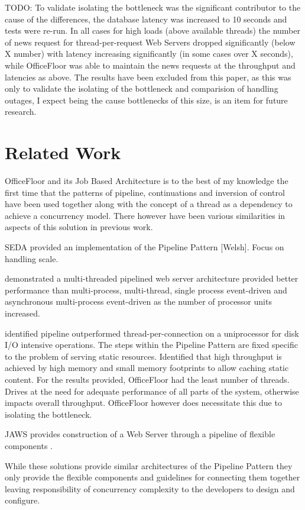 \documentclass[conference]{ieee/IEEEtran}
\begin{document}
TODO: To validate isolating the bottleneck was the significant contributor to
the cause of the differences, the database latency was increased to 10 seconds
and tests were re-run.  In all cases for high loads (above available threads)
the number of news request for thread-per-request Web Servers dropped
significantly (below X number) with latency increasing significantly (in some
cases over X seconds), while OfficeFloor was able to maintain the news requests
at the throughput and latencies as above.  The results have been excluded from
this paper, as this was only to validate the isolating of the bottleneck and
comparision of handling outages, I expect being the cause bottlenecks of this
size, is an item for future research.


\section{Related Work}
OfficeFloor and its Job Based Architecture is to the best of my knowledge the
first time that the patterns of pipeline, continuations and inversion of
control have been used together along with the concept of a thread as a
dependency to achieve a concurrency model.  There however have been various
similarities in aspects of this solution in previous work.

SEDA provided an implementation of the Pipeline Pattern [Welsh]. Focus on
handling scale.

\cite{multithread-pipeline} demonstrated a multi-threaded pipelined web server
architecture provided better performance than multi-process, multi-thread,
single process event-driven and asynchronous multi-process event-driven as the
number of processor units increased.

\cite{knot-userver-watpipe} identified pipeline outperformed
thread-per-connection on a uniprocessor for disk I/O intensive operations. The
steps within the Pipeline Pattern are fixed specific to the problem of serving
static resources.  Identified that high throughput is achieved by high memory
and small memory footprints to allow caching static content.  For the results
provided, OfficeFloor had the least number of threads.  Drives at the need for
adequate performance of all parts of the system, otherwise impacts overall
throughput.  OfficeFloor however does necessitate this due to isolating the
bottleneck.

JAWS provides construction of a Web Server through a pipeline of flexible
components \cite{jaws}.

While these solutions provide similar architectures of the Pipeline Pattern
they only provide the flexible components and guidelines for connecting them
together leaving responsibility of concurrency complexity to the developers to
design and configure.
\end{document}
